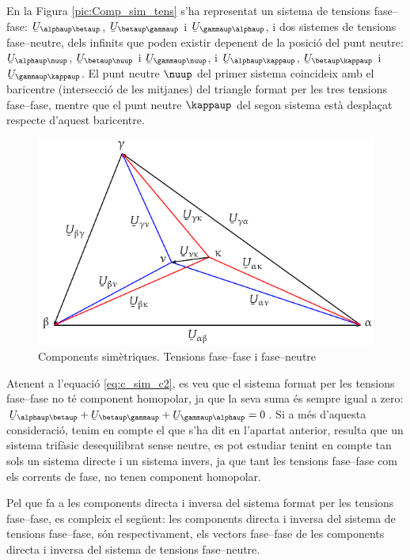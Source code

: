 En la Figura \vref{pic:Comp_sim_tens} s'ha representat un sistema de
tensions fase--fase: $\cmplx{U}_{\alphaup\betaup}$,
$\cmplx{U}_{\betaup\gammaup}$ i $\cmplx{U}_{\gammaup\alphaup}$, i dos
sistemes de tensions fase--neutre, dels infinits que poden existir
depenent de la posici\'{o} del punt neutre: $\cmplx{U}_{\alphaup\nuup}$,
$\cmplx{U}_{\betaup\nuup}$ i $\cmplx{U}_{\gammaup\nuup}$, i
$\cmplx{U}_{\alphaup\kappaup}$, $\cmplx{U}_{\betaup\kappaup}$ i
$\cmplx{U}_{\gammaup\kappaup}$. El punt neutre $\nuup$ del primer sistema
coincideix amb el baricentre (intersecci\'{o} de les mitjanes) del
triangle  format per les tres tensions fase--fase, mentre que el
punt neutre $\kappaup$ del segon sistema est\`{a} despla\c{c}at respecte
d'aquest baricentre.
\begin{figure}[htb]
\centering
    \includegraphics{Imatges/Cap-CompSim-Tensions.pdf}
\caption{Components sim\`{e}triques. Tensions fase--fase i fase--neutre}
\label{pic:Comp_sim_tens}
\end{figure}

Atenent a l'equaci\'{o} \eqref{eq:c_sim_c2}, es veu que el sistema
format per les tensions fase--fase no t\'{e} component homopolar, ja que
la seva suma  \'{e}s sempre igual a zero: $\cmplx{U}_{\alphaup\betaup} +
\cmplx{U}_{\betaup\gammaup} + \cmplx{U}_{\gammaup\alphaup} = 0$. Si a m\'{e}s
d'aquesta consideraci\'{o}, tenim en compte el que s'ha dit en l'apartat
anterior, resulta que un sistema trif\`{a}sic desequilibrat sense
neutre, es pot estudiar tenint en compte tan sols un sistema directe
i un sistema invers, ja que tant les tensions fase--fase com els
corrents de fase, no tenen component homopolar.

Pel que fa a les components directa i inversa del sistema format per
les tensions fase--fase, es compleix el seg\"{u}ent: les components
directa i inversa del sistema de tensions fase--fase, s\'{o}n
respectivament, els vectors fase--fase de les components directa i
inversa del sistema de tensions fase--neutre.

